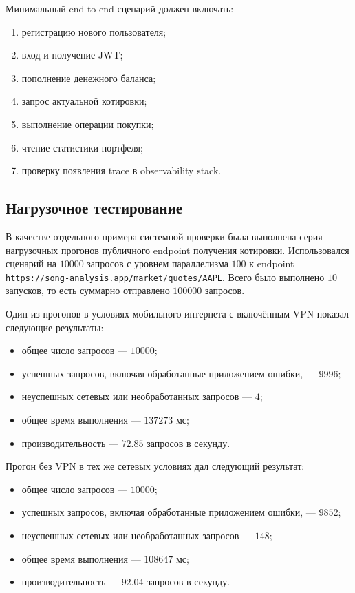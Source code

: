 \documentclass[12pt,a4paper]{article}
\begin{document}
Минимальный end-to-end сценарий должен включать:

\begin{enumerate}[leftmargin=1.2cm]
    \item регистрацию нового пользователя;
    \item вход и получение JWT;
    \item пополнение денежного баланса;
    \item запрос актуальной котировки;
    \item выполнение операции покупки;
    \item чтение статистики портфеля;
    \item проверку появления trace в observability stack.
\end{enumerate}

\subsection{Нагрузочное тестирование}

В качестве отдельного примера системной проверки была выполнена серия нагрузочных прогонов публичного endpoint получения котировки. Использовался сценарий на \(10000\) запросов с уровнем параллелизма \(100\) к endpoint \texttt{https://song-analysis.app/market/quotes/AAPL}. Всего было выполнено \(10\) запусков, то есть суммарно отправлено \(100000\) запросов.

Один из прогонов в условиях мобильного интернета с включённым VPN показал следующие результаты:

\begin{itemize}[leftmargin=1.2cm]
    \item общее число запросов --- \(10000\);
    \item успешных запросов, включая обработанные приложением ошибки, --- \(9996\);
    \item неуспешных сетевых или необработанных запросов --- \(4\);
    \item общее время выполнения --- \(137273\) мс;
    \item производительность --- \(72.85\) запросов в секунду.
\end{itemize}

Прогон без VPN в тех же сетевых условиях дал следующий результат:

\begin{itemize}[leftmargin=1.2cm]
    \item общее число запросов --- \(10000\);
    \item успешных запросов, включая обработанные приложением ошибки, --- \(9852\);
    \item неуспешных сетевых или необработанных запросов --- \(148\);
    \item общее время выполнения --- \(108647\) мс;
    \item производительность --- \(92.04\) запросов в секунду.
\end{itemize}
\end{document}
